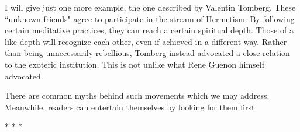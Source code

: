 I will give just one more example, the one described by Valentin Tomberg. These ``unknown friends" agree to participate in the stream of Hermetism. By following certain meditative practices, they can reach a certain spiritual depth. Those of a like depth will recognize each other, even if achieved in a different way. Rather than being unnecessarily rebellious, Tomberg instead advocated a close relation to the exoteric institution. This is not unlike what Rene Guenon himself advocated.

There are common myths behind such movements which we may address. Meanwhile, readers can entertain themselves by looking for them first.




\begin{center}* * *\end{center}

